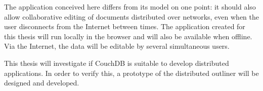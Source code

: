 The application conceived here differs from its model on one point: it should also allow collaborative editing of documents distributed over networks, even when the user disconnects from the Internet between times. The application created for this thesis will run locally in the browser and will also be available when offline. Via the Internet, the data will be editable by several simultaneous users.

This thesis will investigate if CouchDB is suitable to develop distributed applications. In order to verify this, a prototype of the distributed outliner will be designed and developed.